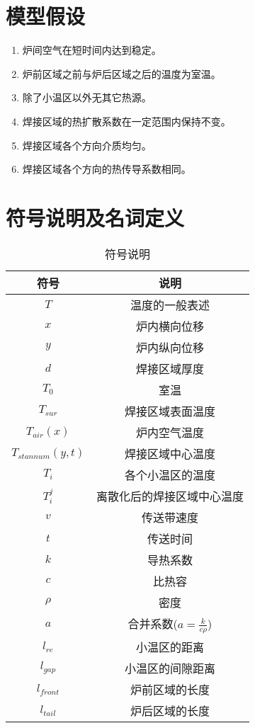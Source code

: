 \documentclass[withoutpreface,bwprint]{cumcmthesis} %
\begin{document}
\section{模型假设}
\begin{enumerate}
	\item 炉间空气在短时间内达到稳定。
	\item 炉前区域之前与炉后区域之后的温度为室温。
	\item 除了小温区以外无其它热源。
	\item 焊接区域的热扩散系数在一定范围内保持不变。
	\item 焊接区域各个方向介质均匀。
	\item 焊接区域各个方向的热传导系数相同。
\end{enumerate}

\newpage
\section{符号说明及名词定义}

\begin{table}[!htb]
	\centering
	\caption{符号说明}
    \begin{tabular}{cc}
        \toprule[1.5pt]
        符号 & 说明\\
        \midrule[1pt]
        $T$ & 温度的一般表述\\
        $x$ & 炉内横向位移\\
        $y$ & 炉内纵向位移\\
        $d$ & 焊接区域厚度\\
        $T_0$ & 室温\\
        $T_{sur}$ & 焊接区域表面温度\\
        $T_{air}(x)$ & 炉内空气温度  \\
        $T_{stannum}(y,t)$ & 焊接区域中心温度 \\
        $T_i$ & 各个小温区的温度\\
        $T^{j}_i$ & 离散化后的焊接区域中心温度\\
        $v$ & 传送带速度 \\
        $t$ & 传送时间 \\
        $k$ & 导热系数 \\
        $c$ & 比热容 \\
        $\rho$ & 密度\\
        $a$ & 合并系数($a=\frac{k}{c\rho}$) \\
        $l_{re}$ & 小温区的距离\\
        $l_{gap}$ & 小温区的间隙距离\\
        $l_{front}$ & 炉前区域的长度\\
        $l_{tail}$ & 炉后区域的长度\\
        
         \bottomrule[1.5pt]
    \end{tabular}
\end{table}
\end{document}
